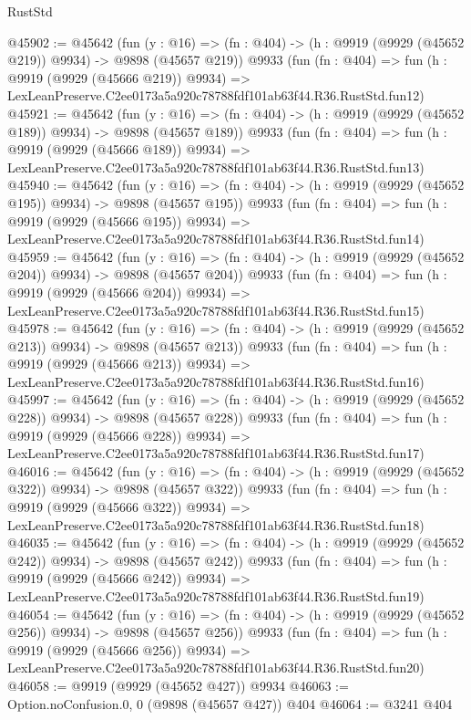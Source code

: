 \begin{lexlean}{RustStd}
\begin{coremodule}
@45902 := @45642
    (fun (y : @16) => (fn : @404) -> (h : @9919 (@9929 (@45652 @219)) @9934) -> @9898 (@45657 @219))
    @9933
    (fun (fn : @404) =>
    fun (h : @9919 (@9929 (@45666 @219)) @9934) =>
    LexLeanPreserve.C2ee0173a5a920c78788fdf101ab63f44.R36.RustStd.fun12)
@45921 := @45642
    (fun (y : @16) => (fn : @404) -> (h : @9919 (@9929 (@45652 @189)) @9934) -> @9898 (@45657 @189))
    @9933
    (fun (fn : @404) =>
    fun (h : @9919 (@9929 (@45666 @189)) @9934) =>
    LexLeanPreserve.C2ee0173a5a920c78788fdf101ab63f44.R36.RustStd.fun13)
@45940 := @45642
    (fun (y : @16) => (fn : @404) -> (h : @9919 (@9929 (@45652 @195)) @9934) -> @9898 (@45657 @195))
    @9933
    (fun (fn : @404) =>
    fun (h : @9919 (@9929 (@45666 @195)) @9934) =>
    LexLeanPreserve.C2ee0173a5a920c78788fdf101ab63f44.R36.RustStd.fun14)
@45959 := @45642
    (fun (y : @16) => (fn : @404) -> (h : @9919 (@9929 (@45652 @204)) @9934) -> @9898 (@45657 @204))
    @9933
    (fun (fn : @404) =>
    fun (h : @9919 (@9929 (@45666 @204)) @9934) =>
    LexLeanPreserve.C2ee0173a5a920c78788fdf101ab63f44.R36.RustStd.fun15)
@45978 := @45642
    (fun (y : @16) => (fn : @404) -> (h : @9919 (@9929 (@45652 @213)) @9934) -> @9898 (@45657 @213))
    @9933
    (fun (fn : @404) =>
    fun (h : @9919 (@9929 (@45666 @213)) @9934) =>
    LexLeanPreserve.C2ee0173a5a920c78788fdf101ab63f44.R36.RustStd.fun16)
@45997 := @45642
    (fun (y : @16) => (fn : @404) -> (h : @9919 (@9929 (@45652 @228)) @9934) -> @9898 (@45657 @228))
    @9933
    (fun (fn : @404) =>
    fun (h : @9919 (@9929 (@45666 @228)) @9934) =>
    LexLeanPreserve.C2ee0173a5a920c78788fdf101ab63f44.R36.RustStd.fun17)
@46016 := @45642
    (fun (y : @16) => (fn : @404) -> (h : @9919 (@9929 (@45652 @322)) @9934) -> @9898 (@45657 @322))
    @9933
    (fun (fn : @404) =>
    fun (h : @9919 (@9929 (@45666 @322)) @9934) =>
    LexLeanPreserve.C2ee0173a5a920c78788fdf101ab63f44.R36.RustStd.fun18)
@46035 := @45642
    (fun (y : @16) => (fn : @404) -> (h : @9919 (@9929 (@45652 @242)) @9934) -> @9898 (@45657 @242))
    @9933
    (fun (fn : @404) =>
    fun (h : @9919 (@9929 (@45666 @242)) @9934) =>
    LexLeanPreserve.C2ee0173a5a920c78788fdf101ab63f44.R36.RustStd.fun19)
@46054 := @45642
    (fun (y : @16) => (fn : @404) -> (h : @9919 (@9929 (@45652 @256)) @9934) -> @9898 (@45657 @256))
    @9933
    (fun (fn : @404) =>
    fun (h : @9919 (@9929 (@45666 @256)) @9934) =>
    LexLeanPreserve.C2ee0173a5a920c78788fdf101ab63f44.R36.RustStd.fun20)
@46058 := @9919 (@9929 (@45652 @427)) @9934
@46063 := Option.noConfusion.{0, 0} (@9898 (@45657 @427)) @404
@46064 := @3241 @404

\end{coremodule}
\end{lexlean}
